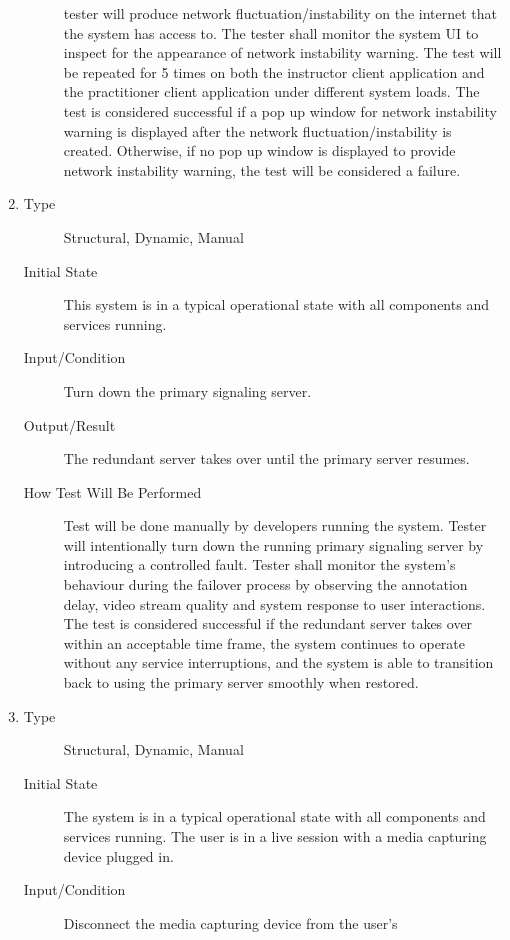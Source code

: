 \documentclass[12pt, titlepage]{article}
\begin{document}
\begin{enumerate}[NFR-T1]
\begin{description}
    tester will produce network fluctuation/instability on the internet that the
    system has access to. The tester shall monitor the system UI to inspect for
    the appearance of network instability warning. The test will be repeated for
    5 times on both the instructor client application and the practitioner
    client application under different system loads. The test is considered
    successful if a pop up window for network instability warning is displayed
    after the network fluctuation/instability is created. Otherwise, if no pop
    up window is displayed to provide network instability warning, the test will
    be considered a failure.
  \end{description}
\item \label{NFRT9}
  \begin{description}
  \item[Type] Structural, Dynamic, Manual
  \item[Initial State] This system is in a typical operational state with all
    components and services running.
  \item[Input/Condition] Turn down the primary signaling server.
  \item[Output/Result] The redundant server takes over until the primary server
    resumes.
  \item[How Test Will Be Performed] Test will be done manually by developers
    running the system. Tester will intentionally turn down the running primary
    signaling server by introducing a controlled fault. Tester shall monitor the
    system’s behaviour during the failover process by observing the annotation
    delay, video stream quality and system response to user interactions. The
    test is considered successful if the redundant server takes over within an
    acceptable time frame, the system continues to operate without any service
    interruptions, and the system is able to transition back to using the
    primary server smoothly when restored.
  \end{description}
\item \label{NFRT10}
  \begin{description}
  \item[Type] Structural, Dynamic, Manual
  \item[Initial State] The system is in a typical operational state with all
    components and services running. The user is in a live session with a media
    capturing device plugged in.
  \item[Input/Condition] Disconnect the media capturing device from the user’s

\end{description}
\end{enumerate}
\end{document}
